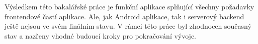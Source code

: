 Výsledkem této bakalářské práce je funkční aplikace splňující všechny požadavky frontendové častí aplikace. Ale, jak Android aplikace, tak i serverový backend ještě nejsou ve svém finálním stavu. V rámci této práce byl zhodnocen současný stav a nazřeny vhodné budoucí kroky pro pokračování vývoje.
